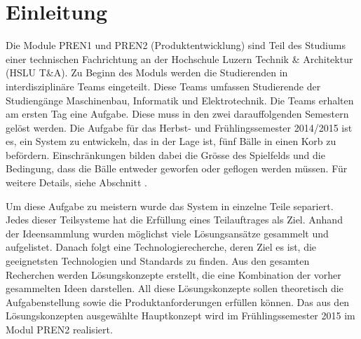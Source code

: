 \section{Einleitung}
Die Module PREN1 und PREN2 (Produktentwicklung) sind Teil des Studiums einer 
technischen Fachrichtung an der Hochschule Luzern Technik \& Architektur 
(HSLU T\&A). 
Zu Beginn des Moduls werden die Studierenden in interdisziplinäre Teams 
eingeteilt. Diese Teams umfassen Studierende der Studiengänge Maschinenbau, 
Informatik und Elektrotechnik. Die Teams erhalten am ersten Tag eine Aufgabe. 
Diese muss in den zwei darauffolgenden Semestern gelöst werden. 
Die Aufgabe für das Herbst- und Frühlingssemester 2014/2015 ist es, ein System zu entwickeln, das in der Lage ist, fünf Bälle in einen Korb zu befördern. Einschränkungen bilden dabei die Grösse des Spielfelds und die Bedingung, dass die Bälle entweder geworfen oder geflogen werden müssen. 
Für weitere Details, siehe Abschnitt . 

Um diese Aufgabe zu meistern wurde das System in einzelne Teile separiert. Jedes dieser Teilsysteme hat die Erfüllung eines Teilauftrages als Ziel. Anhand der Ideensammlung wurden möglichst viele Lösungsansätze gesammelt und aufgelistet. Danach folgt eine Technologierecherche, deren Ziel es ist, die geeignetsten Technologien und Standards zu finden. Aus den gesamten Recherchen werden Lösungskonzepte erstellt, die eine Kombination der vorher gesammelten Ideen darstellen. All diese Lösungskonzepte sollen theoretisch die Aufgabenstellung sowie die Produktanforderungen erfüllen können. Das aus den Lösungskonzepten ausgewählte Hauptkonzept wird im Frühlingssemester 2015 im Modul PREN2 realisiert.